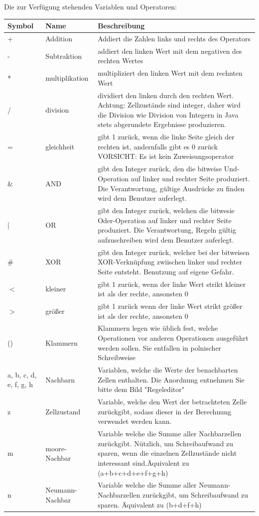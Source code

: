 \documentclass[11pt,a4paper]{article}
\begin{document}
\par
Die zur Verfügung stehenden Variablen und Operatoren:
\par
\begin{longtable}[m]{|m{2cm}|m{2.5cm}|m{6.5cm}|}
\hline
Symbol&Name&Beschreibung\\
\hline
+ & Addition & Addiert die Zahlen links und rechts des Operators\\
\hline
- & Subtraktion & addiert den linken Wert mit dem negativen des rechten Wertes\\
\hline
* & multiplikation & multipliziert den linken Wert mit dem rechnten Wert\\
\hline
/ & division & dividiert den linken durch den rechten Wert. Achtung: Zellzustände sind integer, daher wird die Division wie Division von Integern in Java stets abgerundete Ergebnisse produzieren.\\
\hline
= & gleichheit & gibt 1 zurück, wenn die linke Seite gleich der rechten ist, andernfalls gibt es 0 zurück VORSICHT: Es ist kein Zuweisungsoperator\\ 
\hline

\&  & AND & gibt den Integer zurück, den die bitweise Und-Operation auf linker und rechter Seite produziert. Die Verantwortung, gültige Ausdrücke zu finden wird dem Benutzer auferlegt.\\
\hline
| & OR & gibt den Integer zurück, welchen die bitwesie Oder-Operation auf linker und rechter Seite produziert. Die Verantwortung, Regeln gültig aufzuschreiben wird dem Benutzer auferlegt.\\

\hline
\#&XOR&gibt den Integer zurück, welcher bei der bitweisen XOR-Verknüpfung zwiischen linker und rechter Seite entsteht. Benutzung auf eigene Gefahr.\\
\hline
$<$ & kleiner & gibt 1 zurück, wenn der linke Wert strikt kleiner ist als der rechte, ansonsten 0\\
\hline
$>$&größer & gibt 1 zurück wenn der linke Wert strikt größer ist als der rechte, ansonsten 0\\
\hline
()&Klammern&Klammern legen wie üblich fest, welche Operationen vor anderen Operationen ausgeführt werden sollen. Sie entfallen in polnischer Schreibweise\\
\hline
a, b, c, d, e, f, g, h&Nachbarn&Variablen, welche die Werte der benachbarten Zellen enthalten. Die Anordnung entnehmen Sie bitte dem Bild "Regeleditor"\\
\hline 
z&Zellzustand& Variable, welche den Wert der betrachteten Zelle zurückgibt, sodass dieser in der Berechnung verwendet werden kann.\\
\hline
m&moore-Nachbar&Variable welche die Summe aller Nachbarzellen zurückgibt. Nützlich, um Schreibaufwand zu sparen, wenn die einzelnen Zellzustände nicht interessant sind.Äquivalent zu (a+b+c+d+e+f+g+h)\\
\hline
n&Neumann-Nachbar&Variable welche die Summe aller Neumann-Nachbarzellen zurückgibt, um Schreibaufwand zu sparen.  Äquivalent zu (b+d+f+h)\\
\hline
\end{longtable}
\end{document}
